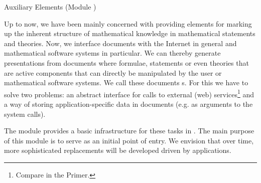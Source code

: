 
\begin{tchapter}[id=ext,short=Auxiliary Elements]{Auxiliary Elements (Module {})}

  Up to now, we have been mainly concerned with providing elements for marking up the
  inherent structure of mathematical knowledge in mathematical statements and
  theories. Now, we interface {\omdoc} documents with the Internet in general and
  mathematical software systems in particular. We can thereby generate presentations from
  {\omdoc} documents where formulae, statements or even theories that are active
  components that can directly be manipulated by the user or mathematical software
  systems. We call these documents {s}.  For this we have to
  solve two problems: an abstract interface for calls to external (web)
  services\footnote{Compare {} in the {\omdoc} Primer.} and a way of
  storing application-specific data in {\omdoc} documents (e.g. as arguments to the system
  calls).

  The module {} provides a basic infrastructure for these tasks in
  {\omdoc}. The main purpose of this module is to serve as an initial point of entry. We
  envision that over time, more sophisticated replacements will be developed driven by
  applications.


\end{tchapter}

